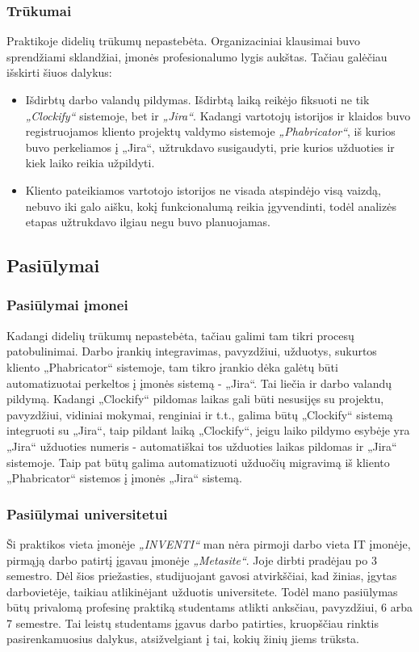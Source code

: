 \subsubsection{Trūkumai}
Praktikoje didelių trūkumų nepastebėta. Organizaciniai klausimai buvo sprendžiami sklandžiai, įmonės profesionalumo lygis aukštas. Tačiau galėčiau išskirti šiuos dalykus:
\medskip

\begin{itemize}
    \item Išdirbtų darbo valandų pildymas. Išdirbtą laiką reikėjo fiksuoti ne tik \textit{„Clockify“} sistemoje, bet ir \textit{„Jira“}. Kadangi vartotojų istorijos ir klaidos buvo registruojamos
    kliento projektų valdymo sistemoje \textit{„Phabricator“}, iš kurios buvo perkeliamos į „Jira“, užtrukdavo susigaudyti, prie kurios užduoties ir kiek laiko reikia užpildyti.
    \item Kliento pateikiamos vartotojo istorijos ne visada atspindėjo visą vaizdą, nebuvo iki galo aišku, kokį funkcionalumą reikia įgyvendinti, todėl analizės etapas užtrukdavo ilgiau
    negu buvo planuojamas.
\end{itemize}


\subsection{Pasiūlymai}

\subsubsection{Pasiūlymai įmonei}
Kadangi didelių trūkumų nepastebėta, tačiau galimi tam tikri procesų patobulinimai. Darbo įrankių integravimas, pavyzdžiui, užduotys, sukurtos kliento „Phabricator“ sistemoje,
tam tikro įrankio dėka galėtų būti automatizuotai perkeltos į įmonės sistemą - „Jira“. Tai liečia ir darbo valandų pildymą. Kadangi „Clockify“ pildomas laikas
gali būti nesusijęs su projektu, pavyzdžiui, vidiniai mokymai, renginiai ir t.t., galima būtų „Clockify“ sistemą integruoti su „Jira“, taip pildant laiką „Clockify“,
jeigu laiko pildymo esybėje yra „Jira“ užduoties numeris - automatiškai tos užduoties laikas pildomas ir „Jira“ sistemoje.
Taip pat būtų galima automatizuoti užduočių migravimą iš kliento „Phabricator“ sistemos į įmonės „Jira“ sistemą.

\subsubsection{Pasiūlymai universitetui}
Ši praktikos vieta įmonėje \textit{„INVENTI“} man nėra pirmoji darbo vieta IT įmonėje, pirmąją darbo patirtį įgavau įmonėje \textit{„Metasite“}. Joje dirbti pradėjau
po 3 semestro. Dėl šios priežasties, studijuojant gavosi atvirkščiai, kad žinias, įgytas darbovietėje, taikiau atlikinėjant užduotis universitete.
Todėl mano pasiūlymas būtų privalomą profesinę praktiką studentams atlikti anksčiau, pavyzdžiui, 6 arba 7 semestre. Tai leistų studentams įgavus darbo patirties,
kruopščiau rinktis pasirenkamuosius dalykus, atsižvelgiant į tai, kokių žinių jiems trūksta.

